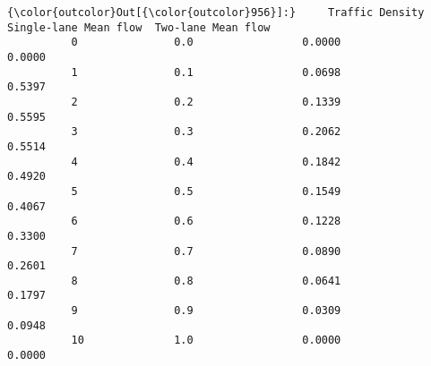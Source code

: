\documentclass[11pt]{article}
\begin{document}
\begin{Verbatim}[commandchars=\\\{\}]
{\color{outcolor}Out[{\color{outcolor}956}]:}     Traffic Density  Single-lane Mean flow  Two-lane Mean flow
          0               0.0                 0.0000              0.0000
          1               0.1                 0.0698              0.5397
          2               0.2                 0.1339              0.5595
          3               0.3                 0.2062              0.5514
          4               0.4                 0.1842              0.4920
          5               0.5                 0.1549              0.4067
          6               0.6                 0.1228              0.3300
          7               0.7                 0.0890              0.2601
          8               0.8                 0.0641              0.1797
          9               0.9                 0.0309              0.0948
          10              1.0                 0.0000              0.0000
\end{Verbatim}
            
\end{document}
